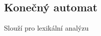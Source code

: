 \documentclass[11pt,a4paper,titlepage]{article}
\begin{document}
	\subsection{Konečný automat}
	\begin{center}
		\bigskip
		\begin{Large} 
			Slouží pro lexikální analýzu
		\end{Large}
	\end{center}          
		
	\newpage	
	
	
\end{document}
